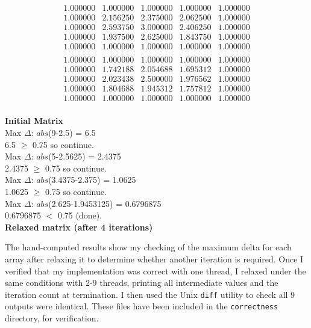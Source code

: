 \documentclass[12pt]{article}
\begin{document}
\begin{minipage}{.5\textwidth}
$$\begin{matrix}
1.000000 & 1.000000 & 1.000000 & 1.000000 & 1.000000 \\ 
1.000000 & 2.156250 & 2.375000 & 2.062500 & 1.000000 \\ 
1.000000 & 2.593750 & 3.000000 & 2.406250 & 1.000000 \\ 
1.000000 & 1.937500 & 2.625000 & 1.843750 & 1.000000 \\ 
1.000000 & 1.000000 & 1.000000 & 1.000000 & 1.000000 \\ 
\end{matrix}
$$
$$
\begin{matrix}
1.000000 & 1.000000 & 1.000000 & 1.000000 & 1.000000 \\ 
1.000000 & 1.742188 & 2.054688 & 1.695312 & 1.000000 \\ 
1.000000 & 2.023438 & 2.500000 & 1.976562 & 1.000000 \\ 
1.000000 & 1.804688 & 1.945312 & 1.757812 & 1.000000 \\ 
1.000000 & 1.000000 & 1.000000 & 1.000000 & 1.000000 \\
\end{matrix}
$$
\end{minipage}\hspace{1.5cm}
\begin{minipage}{.5\textwidth}
\vspace{0.6cm}
	\textbf{Initial Matrix}\\[1.9cm]
	Max $\Delta$: $abs$(9-2.5) = 6.5\\
	6.5 $\geq$ 0.75 so continue.\\[1.6cm]
	
	Max $\Delta$: $abs$(5-2.5625) = 2.4375\\
	2.4375 $\geq$ 0.75 so continue.\\[1.6cm]
	
	Max $\Delta$: $abs$(3.4375-2.375) = 1.0625\\
	1.0625 $\geq$ 0.75 so continue.\\[1.6cm]
	
	Max $\Delta$: $abs$(2.625-1.9453125) = 0.6796875\\
	0.6796875 $<$ 0.75 (done).\\[1.9cm]
	\textbf{Relaxed matrix (after 4 iterations)}
\end{minipage}

The hand-computed results show my checking of the maximum delta for each array after relaxing it to determine whether another iteration is required. Once I verified that my implementation was correct with one thread, I relaxed under the same conditions with 2-9 threads, printing all intermediate values and the iteration count at termination. I then used the Unix \texttt{diff} utility to check all 9 outputs were identical. These files have been included in the \texttt{correctness} directory, for verification.
\end{document}
